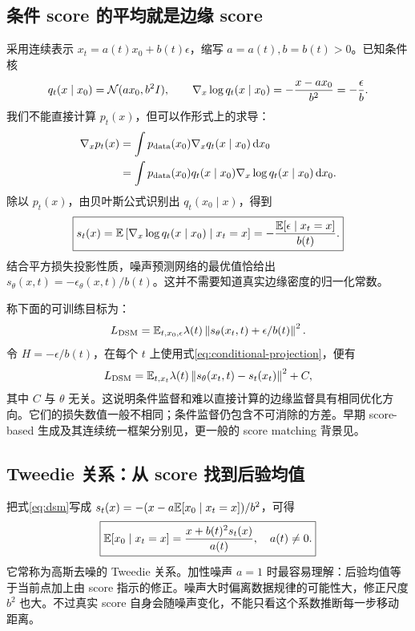 \subsection{条件 score 的平均就是边缘 score}
采用连续表示 $x_t=a(t)x_0+b(t)\epsilon$，缩写 $a=a(t),b=b(t)>0$。已知条件核
\begin{equation}
 q_t(x\mid x_0)=\mathcal{N}(ax_0,b^2I),\qquad
 \nabla_x\log q_t(x\mid x_0)=-\frac{x-ax_0}{b^2}=-\frac\epsilon b.
\end{equation}
我们不能直接计算 $p_t(x)$，但可以作形式上的求导：
\begin{align}
 \nabla_xp_t(x)
 &=\int p_{\mathrm{data}}(x_0)\nabla_xq_t(x\mid x_0)\mathop{}\!\mathrm{d} x_0\\
 &=\int p_{\mathrm{data}}(x_0)q_t(x\mid x_0)
       \nabla_x\log q_t(x\mid x_0)\mathop{}\!\mathrm{d} x_0.
\end{align}
除以 $p_t(x)$，由贝叶斯公式识别出 $q_t(x_0\mid x)$，得到
\begin{equation}\boxed{
 s_t(x)=\mathbb{E}\left[\nabla_x\log q_t(x\mid x_0)\mid x_t=x\right]
       =-\frac{\mathbb{E}[\epsilon\mid x_t=x]}{b(t)}.
 }\label{eq:dsm}\end{equation}
结合平方损失投影性质，噪声预测网络的最优值恰给出
$s_\theta(x,t)=-\epsilon_\theta(x,t)/b(t)$。这并不需要知道真实边缘密度的归一化常数。

称下面的可训练目标为：
\begin{equation}
 L_{\mathrm{DSM}}=\mathbb{E}_{t,x_0,\epsilon}\lambda(t)
 \left\lVert s_\theta(x_t,t)+\epsilon/b(t)\right\rVert^2.
\end{equation}
令 $H=-\epsilon/b(t)$，在每个 $t$ 上使用式\eqref{eq:conditional-projection}，便有
\begin{equation}
 L_{\mathrm{DSM}}=\mathbb{E}_{t,x_t}\lambda(t)\left\lVert s_\theta(x_t,t)-s_t(x_t)\right\rVert^2+C,
\end{equation}
其中 $C$ 与 $\theta$ 无关。这说明条件监督和难以直接计算的边缘监督具有相同优化方向。它们的损失数值一般不相同；条件监督仍包含不可消除的方差。早期 score-based 生成及其连续统一框架分别见\cite{r_ncsn,r_sde}，更一般的 score matching 背景见\cite{r_scorematching}。

\subsection{Tweedie 关系：从 score 找到后验均值}
把式\eqref{eq:dsm}写成 $s_t(x)=-(x-a\mathbb{E}[x_0\mid x_t=x])/b^2$，可得
\begin{equation}\boxed{
 \mathbb{E}[x_0\mid x_t=x]=\frac{x+b(t)^2s_t(x)}{a(t)},\quad a(t)\ne0.
 }\label{eq:tweedie}\end{equation}
它常称为高斯去噪的 Tweedie 关系。加性噪声 $a=1$ 时最容易理解：后验均值等于当前点加上由 score 指示的修正。噪声大时偏离数据规律的可能性大，修正尺度 $b^2$ 也大。不过真实 score 自身会随噪声变化，不能只看这个系数推断每一步移动距离。

